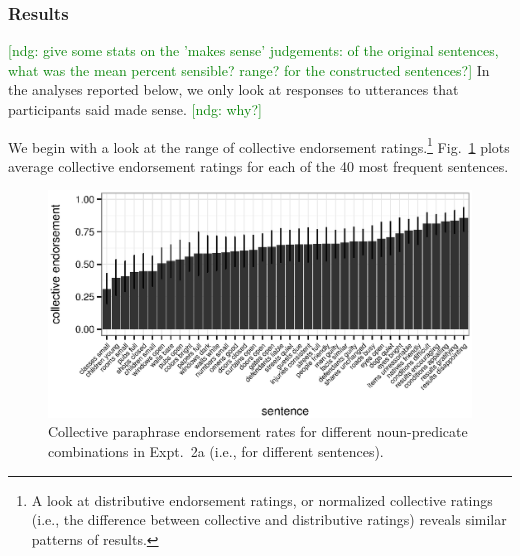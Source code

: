 \documentclass[linguex]{sp}
\newcommand{\ndg}[1]{\textcolor{Green}{[ndg: #1]}}
\begin{document}
%

\subsubsection{Results}

\ndg{give some stats on the 'makes sense' judgements: of the original sentences, what was the mean percent sensible? range? for the constructed sentences?}
In the analyses reported below, we only look at responses to utterances that participants said made sense. \ndg{why?}

We begin with a look at the range of collective endorsement ratings.\footnote{A look at distributive endorsement ratings, or normalized collective ratings (i.e., the difference between collective and distributive ratings) reveals similar patterns of results.} Fig.~\ref{sentence-coll} plots average collective endorsement ratings for each of the 40 most frequent sentences.

\begin{figure}[h!]
	\centering
	\includegraphics[width=.985\linewidth]{plots/sentence_plot2.eps}
	\caption{Collective paraphrase endorsement rates for different noun-predicate combinations in Expt.~2a (i.e., for different sentences).} \label{sentence-coll}
\end{figure}
\end{document}
